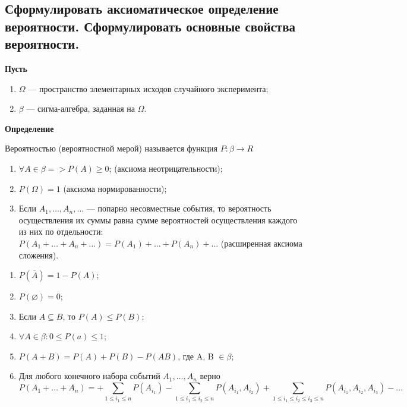 \subsection{Сформулировать аксиоматическое определение вероятности. Сформулировать основные свойства вероятности.}

\textbf{Пусть} 

\begin{enumerate}
	\item $\Omega$ --- пространство элементарных исходов случайного эксперимента;
	\item $\beta$ --- сигма-алгебра, заданная на $\Omega$.
\end{enumerate}

\textbf{Определение}

Вероятностью (вероятностной мерой) называется функция $P: \beta \rightarrow R$

\begin{enumerate}
	\item $\forall A \in \beta => P(A) \geqslant 0$; (аксиома неотрицательности);
	\item $P(\Omega) = 1$ (аксиома нормированности);
	\item Если $A_1, \dots, A_n, \dots$ --- попарно несовместные события, то вероятность осуществления их суммы равна сумме вероятностей осуществления каждого из них по отдельности: $P(A_1 + \dots + A_n + \dots) = P(A_1) + \dots + P(A_n) + \dots$ (расширенная аксиома сложения). 
\end{enumerate}

\begin{enumerate}
	\item $P(\overline{A}) = 1 - P(A)$;
	\item $P(\varnothing) = 0$;
	\item Если $A \subseteq B$, то $P(A) \leqslant P(B)$;
	\item $\forall A \in \beta: 0 \leqslant P(a) \leqslant 1$;
	\item $P(A + B) = P(A) + P(B) - P(AB)$, где A, B $\in \beta$;
	\item Для любого конечного набора событий $A_1, \dots, A_n$ верно
	\begin{equation}
		P(A_1 + \dots + A_n) = + \sum\limits_{1 \leqslant i_1 \leqslant n}P(A_{i_1}) - \sum\limits_{1 \leqslant i_1 \leqslant i_2 \leqslant n}P(A_{i_1}, A_{i_2}) + \sum\limits_{1 \leqslant i_1 \leqslant i_2 \leqslant i_3 \leqslant n}P(A_{i_1}, A_{i_2}, A_{i_3}) - \dots
	\end{equation}
\end{enumerate}

